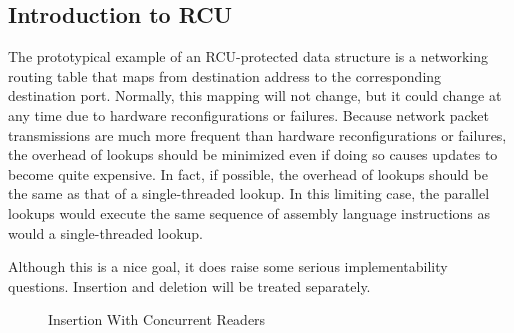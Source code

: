 
\subsection{Introduction to RCU}
\label{sec:defer:Introduction to RCU}

The prototypical example of an RCU-protected data structure is a
networking routing table that maps from destination address to
the corresponding destination port.
Normally, this mapping will not change, but it could change at any
time due to hardware reconfigurations or failures.
Because network packet transmissions are much more frequent than hardware
reconfigurations or failures, the overhead of lookups should be minimized
even if doing so causes updates to become quite expensive.
In fact, if possible, the overhead of lookups should be the same as
that of a single-threaded lookup.
In this limiting case, the parallel lookups would execute the same
sequence of assembly language instructions as would a single-threaded
lookup.

Although this is a nice goal, it does raise some serious implementability
questions.
Insertion and deletion will be treated separately.

\begin{figure}[tb]
\begin{center}
\end{center}
\caption{Insertion With Concurrent Readers}
\label{fig:defer:Insertion With Concurrent Readers}
\end{figure}

